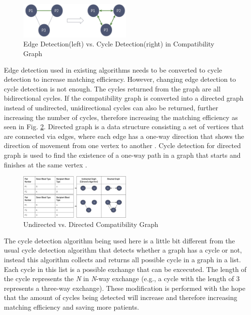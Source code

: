 \documentclass[conference]{IEEEtran}
\begin{document}
\begin{figure}[h]
    \includegraphics[width=0.5\textwidth]{images/edge-vs-cycle-detection.jpg}
    \caption{Edge Detection(left) vs. Cycle Detection(right) in Compatibility Graph}
    \label{edgevscycle}
\end{figure}

Edge detection used in existing algorithms needs to be converted to cycle detection to increase matching efficiency.
However, changing edge detection to cycle detection is not enough. The cycles returned from the graph are all bidirectional
cycles. If the compatibility graph is converted into a directed graph instead of undirected, unidirectional cycles can also be
returned, further increasing the number of cycles, therefore increasing the matching efficiency as seen in Fig. \ref{undirectedvsdirected}.
Directed graph is a data structure consisting a set of vertices that are connected via edges, where each edge has a one-way
direction that shows the direction of movement from one vertex to another \cite{sedgewick}.
Cycle detection for directed graph is used to find the existence of a one-way path in a graph that starts and finishes
at the same vertex \cite{mehta}.

\begin{figure}[h]
    \includegraphics[width=0.5\textwidth]{images/undirected-vs-directed-compatibility-graph.jpg}
    \caption{Undirected vs. Directed Compatibility Graph}
    \label{undirectedvsdirected}
\end{figure}

The cycle detection algorithm being used here is a little bit different from the usual cycle detection algorithm that detects
whether a graph has a cycle or not, instead this algorithm collects and returns all possible cycle in a graph in a list.
Each cycle in this list is a possible exchange that can be excecuted. The length of the cycle represents the \textit{N} in
\textit{N}-way exchange (e.g., a cycle with the length of 3 represents a three-way exchange).
These modification is performed with the hope that the amount of cycles being detected will
increase and therefore increasing matching efficiency and saving more patients.
\end{document}
